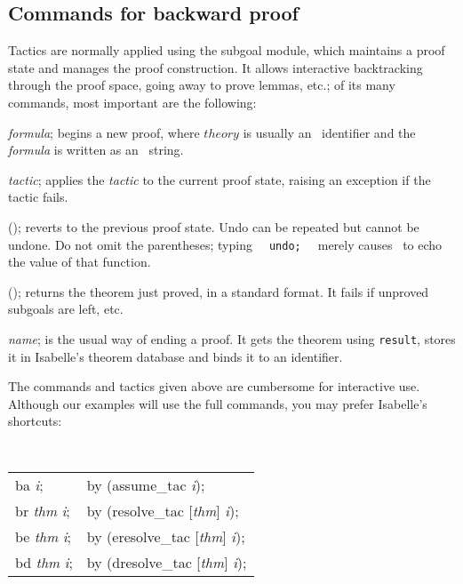 \subsection{Commands for backward proof}
Tactics are normally applied using the subgoal module, which maintains a
proof state and manages the proof construction.  It allows interactive
backtracking through the proof space, going away to prove lemmas, etc.; of
its many commands, most important are the following:
\begin{ttdescription}
\item[\ttindex{Goal} {\it formula}; ] 
begins a new proof, where $theory$ is usually an \ML\ identifier
and the {\it formula\/} is written as an \ML\ string.

\item[\ttindex{by} {\it tactic}; ] 
applies the {\it tactic\/} to the current proof
state, raising an exception if the tactic fails.

\item[\ttindex{undo}(); ]
  reverts to the previous proof state.  Undo can be repeated but cannot be
  undone.  Do not omit the parentheses; typing {\tt\ \ undo;\ \ } merely
  causes \ML\ to echo the value of that function.

\item[\ttindex{result}();]
returns the theorem just proved, in a standard format.  It fails if
unproved subgoals are left, etc.

\item[\ttindex{qed} {\it name};] is the usual way of ending a proof.
  It gets the theorem using \texttt{result}, stores it in Isabelle's
  theorem database and binds it to an \ML{} identifier.

\end{ttdescription}
The commands and tactics given above are cumbersome for interactive use.
Although our examples will use the full commands, you may prefer Isabelle's
shortcuts:
\begin{center} \tt
{}   
\begin{tabular}{l@{\qquad\rm abbreviates\qquad}l}
    ba {\it i};           & by (assume_tac {\it i}); \\

    br {\it thm} {\it i}; & by (resolve_tac [{\it thm}] {\it i}); \\

    be {\it thm} {\it i}; & by (eresolve_tac [{\it thm}] {\it i}); \\

    bd {\it thm} {\it i}; & by (dresolve_tac [{\it thm}] {\it i}); 
\end{tabular}
\end{center}

